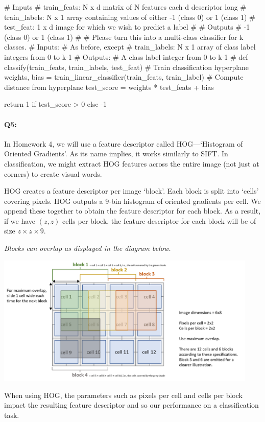 \begin{python}
# Inputs
#   train_feats: N x d matrix of N features each d descriptor long
#   train_labels: N x 1 array containing values of either -1 (class 0) or 1 (class 1)
#   test_feat: 1 x d image for which we wish to predict a label
#
# Outputs
#   -1 (class 0) or 1 (class 1)
#
# Please turn this into a multi-class classifier for k classes.
# Inputs:
#    As before, except
#    train_labels: N x 1 array of class label integers from 0 to k-1
# Outputs:
#    A class label integer from 0 to k-1
#
def classify(train_feats, train_labels, test_feat)
    # Train classification hyperplane
    weights, bias = train_linear_classifier(train_feats, train_label)
    # Compute distance from hyperplane
    test_score = weights * test_feats + bias

    return 1 if test_score > 0 else -1
\end{python}


\pagebreak

\paragraph{Q5:} In Homework 4, we will use a feature descriptor called HOG---`Histogram of Oriented Gradients'. As its name implies, it works similarly to SIFT. In classification, we might extract HOG features across the entire image (not just at corners) to create visual words.

HOG creates a feature descriptor per image `block'. Each block is split into `cells' covering pixels. HOG outputs a 9-bin histogram of oriented gradients per cell. We append these together to obtain the feature descriptor for each block. As a result, if we have $(z,z)$ cells per block, the feature descriptor for each block will be of size $z \times z \times 9$. 

\emph{Blocks can overlap as displayed in the diagram below.}
%
\begin{center}
    \includegraphics[clip, trim = {0.2cm, 0.35cm, 0.2cm, 0.2cm}, width=12.5cm]{hog-diagram.png} %
\end{center}
%
When using HOG, the parameters such as pixels per cell and cells per block impact the resulting feature descriptor and so our performance on a classification task.

